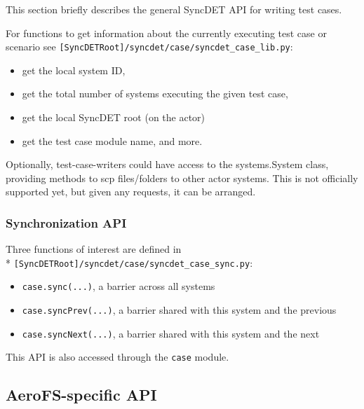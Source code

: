 This section briefly describes the general SyncDET API for writing test cases.
 
For functions to get information about the currently executing test case or
scenario see {\tt [SyncDETRoot]/syncdet/case/syncdet\_case\_lib.py}:
\begin{itemize}
\item get the local system ID, 
\item get the total number of systems executing the given test case, 
\item get the local SyncDET root (on the actor)
\item get the test case module name, and more.
\end{itemize}

Optionally, test-case-writers could have access to the systems.System class,
providing methods to scp files/folders to other actor systems. This is not
officially supported yet, but given any requests, it can be arranged.

\subsubsection{Synchronization API}

Three functions of interest are defined in \\*
{\tt [SyncDETRoot]/syncdet/case/syncdet\_case\_sync.py}:
\begin{itemize}
\item {\tt case.sync(...)}, a barrier across all systems
\item {\tt case.syncPrev(...)}, a barrier shared with this system and the previous
\item {\tt case.syncNext(...)}, a barrier shared with this system and the next
\end{itemize}
This API is also accessed through the {\tt case} module.

\subsection{AeroFS-specific API}

